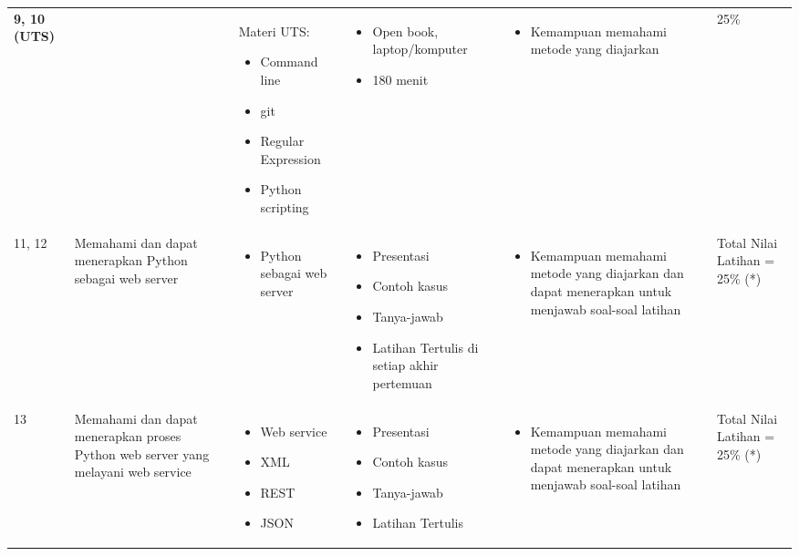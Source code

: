 \documentclass[11pt, a4paper]{article}
\newenvironment{myitemize}
{ \begin{itemize} [label={--},noitemsep,leftmargin=*,topsep=0pt,partopsep=0pt]  }
	{ \end{itemize}  }
\begin{document}
\begin{longtable}{p{1cm}P{3cm}P{3cm}P{3cm}P{3.5cm}P{1.5cm}}
\textbf{9, 10 (UTS)} & & Materi UTS:
\begin{myitemize}
	\item
	Command line
	\item
	git
	\item
	Regular Expression
	\item
	Python scripting
\end{myitemize} &
\begin{myitemize}
	\item
	Open book, laptop/komputer
	\item
	180 menit
\end{myitemize} &
\begin{myitemize}
	\item Kemampuan memahami metode yang diajarkan 
\end{myitemize} &
25\%\\

11, 12 & Memahami dan dapat menerapkan Python sebagai web server &
\begin{myitemize}
	\item
	Python sebagai web server
\end{myitemize} & 
\begin{myitemize}
	\item
	Presentasi
	\item
	Contoh kasus
	\item
	Tanya-jawab
	\item
	Latihan Tertulis di setiap akhir pertemuan
\end{myitemize} &
\begin{myitemize}
	\item Kemampuan memahami metode yang diajarkan dan dapat menerapkan untuk menjawab soal-soal latihan
\end{myitemize} & 
Total Nilai Latihan = 25\% (*)\\

13 & Memahami dan dapat menerapkan proses Python web server yang melayani web service & \begin{myitemize}
	\item
	Web service
	\item
	XML
	\item
	REST
	\item
	JSON
\end{myitemize} & 
\begin{myitemize}
	\item
	Presentasi
	\item
	Contoh kasus
	\item
	Tanya-jawab
	\item
	Latihan Tertulis
\end{myitemize} &
\begin{myitemize}
	\item Kemampuan memahami metode yang diajarkan dan dapat menerapkan untuk menjawab soal-soal latihan
\end{myitemize} &
Total Nilai Latihan = 25\% (*)\\


\end{longtable}
\end{document}
